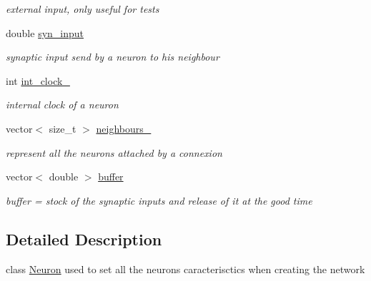 \begin{DoxyCompactItemize}
\begin{DoxyCompactList}\small\item\em external input, only useful for tests \end{DoxyCompactList}\item 
\hypertarget{classNeuron_add16f88ac5bb74f22d8801bdebcddf38}{double \hyperlink{classNeuron_add16f88ac5bb74f22d8801bdebcddf38}{syn\-\_\-input}}\label{classNeuron_add16f88ac5bb74f22d8801bdebcddf38}

\begin{DoxyCompactList}\small\item\em synaptic input send by a neuron to his neighbour \end{DoxyCompactList}\item 
\hypertarget{classNeuron_a3c9d3010041c4953fbd8f8a409ea6ac9}{int \hyperlink{classNeuron_a3c9d3010041c4953fbd8f8a409ea6ac9}{int\-\_\-clock\-\_\-}}\label{classNeuron_a3c9d3010041c4953fbd8f8a409ea6ac9}

\begin{DoxyCompactList}\small\item\em internal clock of a neuron \end{DoxyCompactList}\item 
\hypertarget{classNeuron_a363bb83c58778315c9c384c05df9948a}{vector$<$ size\-\_\-t $>$ \hyperlink{classNeuron_a363bb83c58778315c9c384c05df9948a}{neighbours\-\_\-}}\label{classNeuron_a363bb83c58778315c9c384c05df9948a}

\begin{DoxyCompactList}\small\item\em represent all the neurons attached by a connexion \end{DoxyCompactList}\item 
\hypertarget{classNeuron_a72da7b39ce26743cf6598be74d6584b8}{vector$<$ double $>$ \hyperlink{classNeuron_a72da7b39ce26743cf6598be74d6584b8}{buffer}}\label{classNeuron_a72da7b39ce26743cf6598be74d6584b8}

\begin{DoxyCompactList}\small\item\em buffer = stock of the synaptic inputs and release of it at the good time \end{DoxyCompactList}\end{DoxyCompactItemize}


\subsection{Detailed Description}
class \hyperlink{classNeuron}{Neuron} used to set all the neurons caracterisctics when creating the network 

